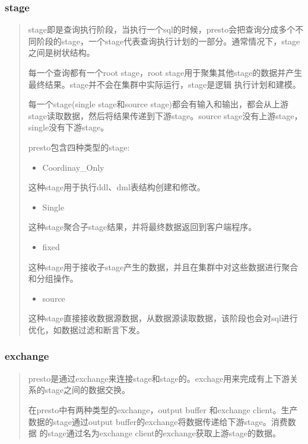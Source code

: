 \documentclass[letterpaper,10pt,english]{sphinxmanual}
\begin{document}
\subsubsection{stage}
\label{\detokenize{overview/concept:stage}}\begin{quote}

stage即是查询执行阶段，当执行一个sql的时候，presto会把查询分成多个不同阶段的stage，一个stage代表查询执行计划的一部分。通常情况下，stage
之间是树状结构。

每一个查询都有一个root stage，root stage用于聚集其他stage的数据并产生最终结果。stage并不会在集群中实际运行，stage是逻辑
执行计划和建模。

每一个stage(single stage和source stage)都会有输入和输出，都会从上游stage读取数据，然后将结果传递到下游stage。source
stage没有上游stage，single没有下游stage。

\noindent{}

presto包含四种类型的stage:
\begin{itemize}
\item {} 
Coordinay\_Only

\end{itemize}

这种stage用于执行ddl、dml表结构创建和修改。
\begin{itemize}
\item {} 
Single

\end{itemize}

这种stage聚合子stage结果，并将最终数据返回到客户端程序。
\begin{itemize}
\item {} 
fixed

\end{itemize}

这种stage用于接收子stage产生的数据，并且在集群中对这些数据进行聚合和分组操作。
\begin{itemize}
\item {} 
source

\end{itemize}

这种stage直接接收数据源数据，从数据源读取数据，该阶段也会对sql进行优化，如数据过滤和断言下发。
\end{quote}


\subsubsection{exchange}
\label{\detokenize{overview/concept:exchange}}\begin{quote}

presto是通过exchange来连接stage和stage的。exchage用来完成有上下游关系的stage之间的数据交换。

在presto中有两种类型的exchange，output buffer 和exchange client。生产数据的stage通过output buffer的exchange将数据传递给下游stage。消费数据
的stage通过名为exchange client的exchange获取上游stage的数据。
\end{quote}
\end{document}
